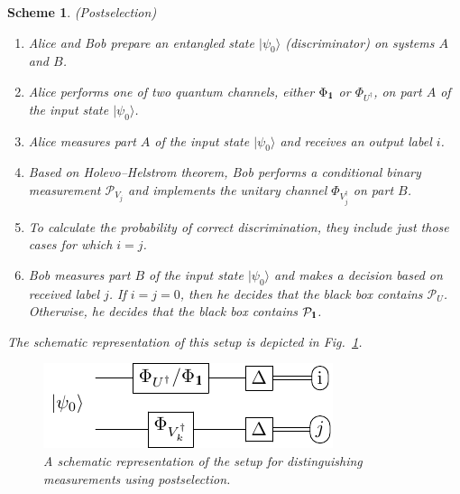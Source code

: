 \documentclass[preprint,12pt, a4paper]{elsarticle}
\newcommand{\ket}[1]{\ensuremath{|#1\rangle}}
\newcommand{\1}{{\rm 1\hspace{-0.9mm}l}}
\newcommand{\Id}{{\rm 1\hspace{-0.9mm}l}}
\newcommand{\PP}{\mathcal{P}}
\newtheorem{scheme}{Scheme}
\begin{document}
\begin{scheme}(Postselection)









\begin{enumerate}
\item Alice and Bob prepare an entangled state $\ket{\psi_{0}}$ (discriminator) on systems 
$A$ and $B$.
\item Alice performs one of two quantum channels, either $\Phi_{\Id}$ or 
$\Phi_{U^\dagger}$,  on part $A$ of the input state  $\ket{\psi_{0}}$.
\item Alice measures part $A$ of the input state  $\ket{\psi_{0}}$ and 
receives an output label $i$.
\item  
Based on Holevo--Helstrom theorem, Bob performs a conditional binary 
measurement	$\PP_{V_j}$ and implements the unitary channel 	$\Phi_{V_j^\dagger}$ on part $B$.
\item To calculate the probability of correct discrimination, they include just those cases for which $i = j$.
\item Bob measures part $B$ of the input state  $\ket{\psi_{0}}$ and makes a
decision based on received label $j$. If $i=j=0$, then he decides that the 
black box contains $\PP_U$. Otherwise, he decides that the black box contains
$\PP_{\Id}$.
\end{enumerate}


The schematic representation of this setup is depicted in 
Fig.~\ref{fig:postsellection}.     

\begin{figure}[h!]
	\centering 
	\includegraphics[scale=1.7]{pics/postselection} 
	
	\caption{ A schematic representation of the setup for distinguishing
		measurements using postselection. 
	}\label{fig:postsellection}
\end{figure}  


\end{scheme}
\end{document}
